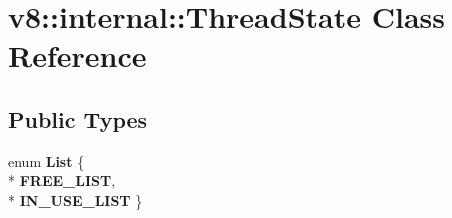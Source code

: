 \hypertarget{classv8_1_1internal_1_1_thread_state}{}\section{v8\+:\+:internal\+:\+:Thread\+State Class Reference}
\label{classv8_1_1internal_1_1_thread_state}
\subsection*{Public Types}
\begin{DoxyCompactItemize}
\item 
enum {\bfseries List} \{ \\*
{\bfseries F\+R\+E\+E\+\_\+\+L\+I\+ST}, 
\\*
{\bfseries I\+N\+\_\+\+U\+S\+E\+\_\+\+L\+I\+ST}
 \}\hypertarget{classv8_1_1internal_1_1_thread_state_a395f566f2cfacad9de5f830d10867f8e}{}\label{classv8_1_1internal_1_1_thread_state_a395f566f2cfacad9de5f830d10867f8e}

\end{DoxyCompactItemize}
